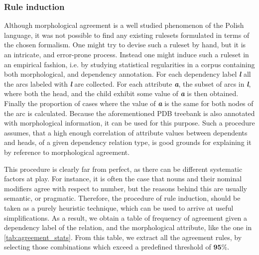 \documentclass[12pt]{article}
\newcommand{\symbolic}[1]{\textit{\textbf{#1}}}
\begin{document}
\subsubsection{Rule induction}
Although morphological agreement is a well studied phenomenon of the Polish language, it was not possible to find any existing rulesets formulated in terms of the chosen formalism. One might try to devise such a ruleset by hand, but it is an intricate, and error-prone process. Instead one might induce such a ruleset in an empirical fashion, i.e. by studying statistical regularities in a corpus containing both morphological, and dependency annotation. For each dependency label \symbolic{l} all the arcs labeled with \symbolic{l} are collected. For each attribute \symbolic{a}, the subset of arcs in \symbolic{l}, where both the head, and the child exhibit some value of \symbolic{a} is then obtained. Finally the proportion of cases where the value of \symbolic{a} is the same for both nodes of the arc is calculated. Because the aforementioned PDB treebank is also annotated with morphological information, it can be used for this purpose. Such a procedure assumes, that a high enough correlation of attribute values between dependents and heads, of a given dependency relation type, is good grounds for explaining it by reference to morphological agreement. 

This procedure is clearly far from perfect, as there can be different systematic factors at play. For instance, it is often the case that nouns and their nominal modifiers agree with respect to number, but the reasons behind this are usually semantic, or pragmatic. Therefore, the procedure of rule induction, should be taken as a purely heuristic technique, which can be used to arrive at useful simplifications. As a result, we obtain a table of frequency of agreement given a dependency label of the relation, and the morphological attribute, like the one in \autoref{tab:agreement_stats}. From this table, we extract all the agreement rules, by selecting those combinations which exceed a predefined threshold of $\textbf{95\%}$.
\end{document}
